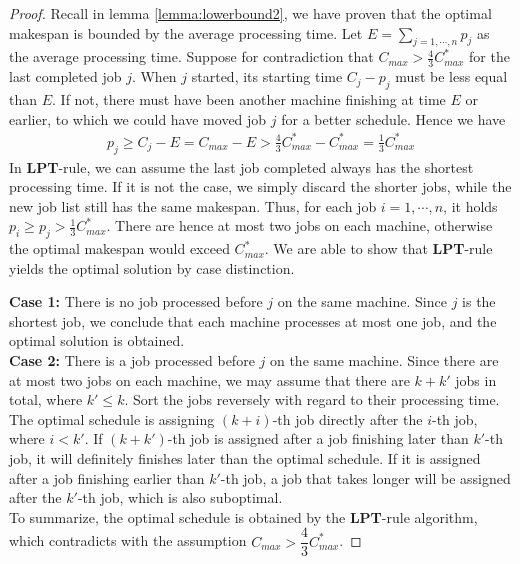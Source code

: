\documentclass[11pt,psfig,times]{article}
\begin{document}
\begin{proof}
    Recall in lemma \cref{lemma:lowerbound2}, we have proven that the optimal makespan is bounded by the average processing time.
    Let $E =  \sum_{j=1, \cdots, n} p_j$ as the average processing time.
    Suppose for contradiction that $C_{max} > \frac{4}{3} C_{max}^*$ for the last completed job $j$. 
    When $j$ started, its starting time $C_j - p_j$ must be less equal 
    than $E$. If not, there must have been another machine finishing at time $E$ or earlier, to which we could have moved job $j$
    for a better schedule. Hence we have 
    \begin{align*}
        p_j \geq C_j - E = C_{max} - E > \frac{4}{3}C_{max}^* - C_{max}^* = \frac{1}{3} C_{max}^*
    \end{align*}
    In \textbf{LPT}-rule, we can assume the last job completed always has the shortest processing time.
    If it is not the case, we simply discard the shorter jobs, while the new job list still has the same makespan. 
    Thus, for each job $i = 1, \cdots, n$, it holds $p_i \geq p_j > \frac{1}{3}C_{max}^*$. 
    There are hence at most two jobs on each machine, otherwise the optimal makespan would exceed $C_{max}^*$. 
    We are able to show that \textbf{LPT}-rule yields the optimal solution by case distinction. 
    
    \textbf{Case 1:} There is no job processed before $j$ on the same machine. Since $j$ is the shortest job, 
    we conclude that each machine processes at most one job, and the optimal solution is obtained.\\
    \textbf{Case 2:} There is a job processed before $j$ on the same machine. Since there are at most two jobs on each 
    machine, we may assume that there are $k + k'$ jobs in total, where $k' \leq k$. 
    Sort the jobs reversely with regard to their processing time. The optimal schedule is assigning $(k + i)$-th job 
    directly after the $i$-th job, where $i < k'$. If $(k+k')$-th job is assigned after a job finishing later than $k'$-th job, it will 
    definitely finishes later than the optimal schedule. If it is assigned after a job finishing earlier than $k'$-th job, 
    a job that takes longer will be assigned after the $k'$-th job, which is also suboptimal.\\
    To summarize, the optimal schedule is obtained by the \textbf{LPT}-rule algorithm, which contradicts with the assumption $C_{max} > \dfrac{4}{3} C_{max}^*$.
\end{proof}
\end{document}
